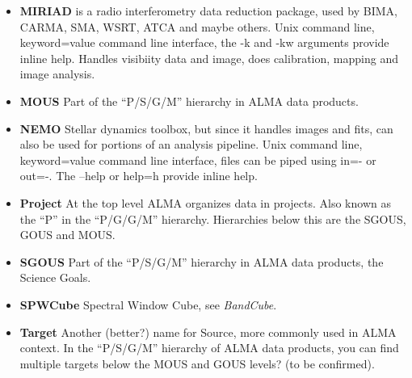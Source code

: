 \documentclass[preprint]{aastex}
\begin{document}
\begin{itemize}
\item {\bf MIRIAD}
is a radio interferometry data reduction package,
used by BIMA, CARMA, SMA, WSRT, ATCA and maybe others.  Unix command line,
keyword=value command line interface, the -k and -kw arguments provide inline
help. Handles visibiity data and image, does calibration, mapping and image
analysis.

\item {\bf MOUS}  Part of the ``P/S/G/M'' hierarchy in ALMA data products.

\item {\bf NEMO}
Stellar dynamics toolbox, but since it handles images and fits, can also be used for
portions of an analysis pipeline.  Unix command line, keyword=value command line interface, 
files can be piped using in=- or out=-. The --help or help=h provide inline help.

\item {\bf Project} At the top level ALMA organizes data in projects. Also known
as the ``P'' in the ``P/G/G/M'' hierarchy.
Hierarchies below this are the SGOUS, GOUS and MOUS. 

\item {\bf SGOUS}  Part of the ``P/S/G/M'' hierarchy in ALMA data products, the Science Goals.

\item {\bf SPWCube} Spectral Window Cube, see {\it BandCube}.

\item {\bf Target} Another (better?) name for Source, more commonly used in ALMA context.
In the ``P/S/G/M'' hierarchy of ALMA data products, you can find multiple targets
below the MOUS and GOUS levels? (to be confirmed).


\end{itemize}
\end{document}
